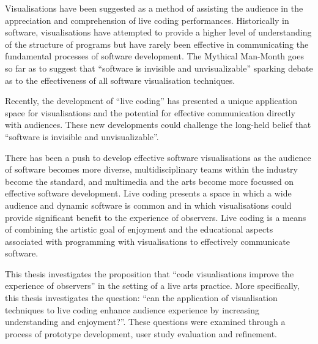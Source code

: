 

Visualisations have been suggested as a method of assisting the audience in the appreciation and comprehension of live coding performances. Historically in software, visualisations have attempted to provide a higher level of understanding of the structure of programs but have rarely been effective in communicating the fundamental processes of software development. The Mythical Man-Month goes so far as to suggest that ``software is invisible and unvisualizable''\cite{Brooks1995} sparking debate as to the effectiveness of all software visualisation techniques.

Recently, the development of ``live coding'' has presented a unique application space for visualisations and the potential for effective communication directly with audiences. These new developments could challenge the long-held belief that ``software is invisible and unvisualizable''.

There has been a push to develop effective software visualisations as the audience of software becomes more diverse, multidisciplinary teams within the industry become the standard, and multimedia and the arts become more focussed on effective software development. Live coding presents a space in which a wide audience and dynamic software is common and in which visualisations could provide significant benefit to the experience of observers. Live coding is a means of combining the artistic goal of enjoyment and the educational aspects associated with programming with visualisations to effectively communicate software.

This thesis investigates the proposition that ``code visualisations improve the experience of observers'' in the setting of a live arts practice. More specifically, this thesis investigates the question: ``can the application of visualisation techniques to live coding enhance audience experience by increasing understanding and enjoyment?''. These questions were examined through a process of prototype development, user study evaluation and refinement.


